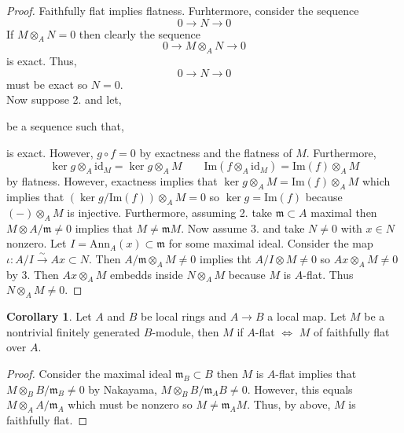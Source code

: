 \documentclass[12pt]{article}
\renewcommand{\Im}[1]{\mathrm{Im}(#1)}
\newcommand{\id}{\mathrm{id}}
\newcommand{\Ann}[2]{\mathrm{Ann}_{#1}\left(#2\right)}
\newcommand{\m}{\mathfrak{m}}
\theoremstyle{remark}
\theoremstyle{definition}
\newtheorem{corollary}[theorem]{Corollary}
\begin{document}
\begin{proof}
Faithfully flat implies flatness. Furhtermore, consider the sequence 
\[ 0 \to N \to 0\]
If $M \otimes_A N = 0$ then clearly the sequence 
\[ 0 \to M \otimes_A N \to 0\]
is exact. Thus, 
\[ 0 \to N \to 0 \] must be exact so $N = 0$. 
\bigskip\\
Now suppose 2. and let,
\begin{center}
\end{center}
be a sequence such that,
\begin{center}
\end{center}
is exact. However, $g \circ f = 0$ by exactness and the flatness of $M$. Furthermore, 
\[ \ker{g \otimes_A \id_M} = \ker{g} \otimes_A M \quad \quad \Im{f \otimes_A \id_M} = \Im{f} \otimes_A M \]
by flatness. However, exactness implies that $\ker{g} \otimes_A M = \Im{f} \otimes_A M$ which implies that $(\ker{g} / \Im{f}) \otimes_A M  = 0$ so $\ker{g} = \Im{f}$ because $(-) \otimes_A M$ is injective. Furthermore, assuming 2. take $\m \subset A$ maximal then $M \otimes A / \m \neq 0$ implies that $M \neq \m M$. Now assume 3. and take $N \neq 0$ with $x \in N$ nonzero. Let $I = \Ann{A}{x} \subset \m$ for some maximal ideal. Consider the map $\iota : A / I \xrightarrow{\sim} A x \subset N$. Then $A / \m \otimes_A M \neq 0$ implies tht $A / I \otimes M \neq 0$ so $A x \otimes_A M \neq 0$ by 3. Then $A x \otimes_A M$ embedds inside $N \otimes_A M$ because $M$ is $A$-flat. Thus $N \otimes_A M \neq 0$. 
\end{proof}

\begin{corollary}
Let $A$ and $B$ be local rings and $A \to B$ a local map. Let $M$ be a nontrivial finitely generated $B$-module, then $M$ if $A$-flat $\iff$ $M$ of faithfully flat over $A$.
\end{corollary}

\begin{proof}
Consider the maximal ideal $\m_B \subset B$ then $M$ is $A$-flat implies that $M \otimes_B B / \m_B \neq 0$ by Nakayama, $M \otimes_B B / \m_A B \neq 0$. However, this equals $M \otimes_A A / \m_A$ which must be nonzero so $M \neq \m_A M$. Thus, by above, $M$ is faithfully flat.
\end{proof}
\end{document}
